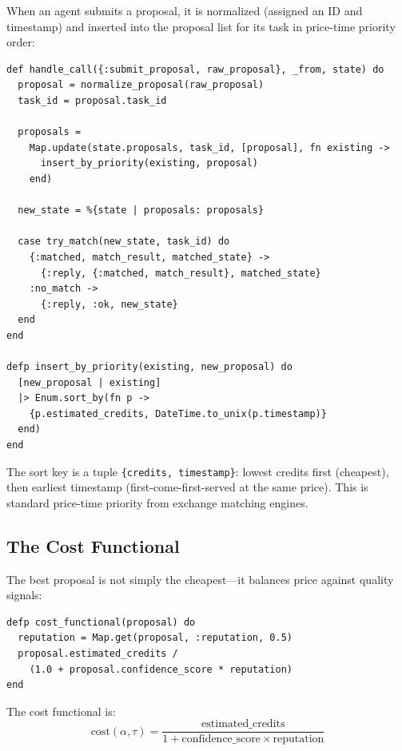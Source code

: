 \documentclass[12pt,a4paper]{article}
\theoremstyle{plain}
\theoremstyle{definition}
\begin{document}
When an agent submits a proposal, it is normalized (assigned an ID and timestamp) and inserted into the proposal list for its task in price-time priority order:

\begin{lstlisting}[caption={Proposal submission with priority insertion},label={lst:ob-submit}]
def handle_call({:submit_proposal, raw_proposal}, _from, state) do
  proposal = normalize_proposal(raw_proposal)
  task_id = proposal.task_id

  proposals =
    Map.update(state.proposals, task_id, [proposal], fn existing ->
      insert_by_priority(existing, proposal)
    end)

  new_state = %{state | proposals: proposals}

  case try_match(new_state, task_id) do
    {:matched, match_result, matched_state} ->
      {:reply, {:matched, match_result}, matched_state}
    :no_match ->
      {:reply, :ok, new_state}
  end
end

defp insert_by_priority(existing, new_proposal) do
  [new_proposal | existing]
  |> Enum.sort_by(fn p ->
    {p.estimated_credits, DateTime.to_unix(p.timestamp)}
  end)
end
\end{lstlisting}

The sort key is a tuple \texttt{\{credits, timestamp\}}: lowest credits first (cheapest), then earliest timestamp (first-come-first-served at the same price). This is standard price-time priority from exchange matching engines.

\subsection{The Cost Functional}

The best proposal is not simply the cheapest---it balances price against quality signals:

\begin{lstlisting}[caption={Cost functional for proposal ranking},label={lst:cost-functional}]
defp cost_functional(proposal) do
  reputation = Map.get(proposal, :reputation, 0.5)
  proposal.estimated_credits /
    (1.0 + proposal.confidence_score * reputation)
end
\end{lstlisting}

The cost functional is:
\begin{equation}\label{eq:cost}
    \text{cost}(\alpha, \tau) = \frac{\text{estimated\_credits}}{1 + \text{confidence\_score} \times \text{reputation}}
\end{equation}
\end{document}
